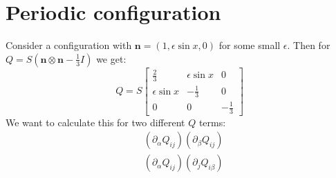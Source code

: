 \documentclass[reqno]{article}
\begin{document}
\section{Periodic configuration}

Consider a configuration with $\mathbf{n} = \left( 1, \epsilon \sin x, 0 \right)$ for some small $\epsilon$.
Then for $Q = S \left( \mathbf{n} \otimes \mathbf{n} - \tfrac13 I \right)$ we get:
\begin{equation}
    Q
    =
    S
    \begin{bmatrix}
        \frac23 &\epsilon \sin x &0 \\
        \epsilon \sin x &-\frac13 &0 \\
        0 &0 &-\frac13
    \end{bmatrix}
\end{equation}
We want to calculate this for two different $Q$ terms:
\begin{align}
    &\left(\partial_\alpha Q_{ij} \right) \left( \partial_\beta Q_{ij} \right) \\
    &\left(\partial_\alpha Q_{ij} \right) \left( \partial_j Q_{i\beta} \right)
\end{align}
\end{document}
